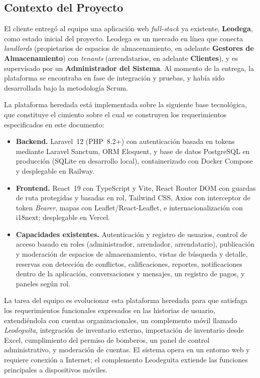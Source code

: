 \subsection{Contexto del Proyecto}

El cliente entregó al equipo una aplicación web \textit{full-stack} ya existente, \textbf{Leodega}, como estado inicial del proyecto. Leodega es un mercado en línea que conecta \textit{landlords} (propietarios de espacios de almacenamiento, en adelante \textbf{Gestores de Almacenamiento}) con \textit{tenants} (arrendatarios, en adelante \textbf{Clientes}), y es supervisado por un \textbf{Administrador del Sistema}. Al momento de la entrega, la plataforma se encontraba en fase de integración y pruebas, y había sido desarrollada bajo la metodología Scrum.

La plataforma heredada está implementada sobre la siguiente base tecnológica, que constituye el cimiento sobre el cual se construyen los requerimientos especificados en este documento:

\begin{itemize}
    \item \textbf{Backend.} Laravel~12 (PHP~8.2+) con autenticación basada en tokens mediante Laravel Sanctum, ORM Eloquent, y base de datos PostgreSQL en producción (SQLite en desarrollo local), containerizado con Docker Compose y desplegable en Railway.
    \item \textbf{Frontend.} React~19 con TypeScript y Vite, React Router DOM con guardas de ruta protegidas y basadas en rol, Tailwind CSS, Axios con interceptor de token \textit{Bearer}, mapas con Leaflet/React-Leaflet, e internacionalización con i18next; desplegable en Vercel.
    \item \textbf{Capacidades existentes.} Autenticación y registro de usuarios, control de acceso basado en roles (administrador, arrendador, arrendatario), publicación y moderación de espacios de almacenamiento, vistas de búsqueda y detalle, reservas con detección de conflictos, calificaciones, reportes, notificaciones dentro de la aplicación, conversaciones y mensajes, un registro de pagos, y paneles según rol.
\end{itemize}

La tarea del equipo es evolucionar esta plataforma heredada para que satisfaga los requerimientos funcionales expresados en las historias de usuario, extendiéndola con cuentas organizacionales, un complemento móvil llamado \textit{Leodeguita}, integración de inventario externo, importación de inventario desde Excel, cumplimiento del permiso de bomberos, un panel de control administrativo, y moderación de cuentas. El sistema opera en un entorno web y requiere conexión a Internet; el complemento Leodeguita extiende las funciones principales a dispositivos móviles.

